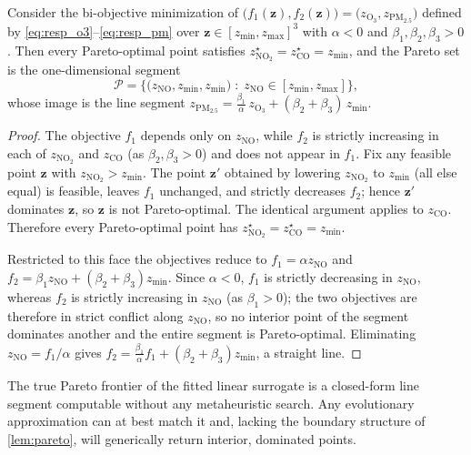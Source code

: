 \begin{lemma}
\label{lem:pareto}
Consider the bi-objective minimization of
$\big(f_1(\mathbf{z}),f_2(\mathbf{z})\big)=\big(z_{\mathrm{O_3}},z_{\mathrm{PM_{2.5}}}\big)$
defined by \eqref{eq:resp_o3}--\eqref{eq:resp_pm} over
$\mathbf{z}\in[z_{\min},z_{\max}]^3$ with $\alpha<0$ and $\beta_1,\beta_2,\beta_3>0$.
Then every Pareto-optimal point satisfies
$z_{\mathrm{NO_2}}^{\star}=z_{\mathrm{CO}}^{\star}=z_{\min}$, and the Pareto set is the
one-dimensional segment
\[
  \mathcal{P}=\Big\{\big(z_{\mathrm{NO}},z_{\min},z_{\min}\big)\;:\;
  z_{\mathrm{NO}}\in[z_{\min},z_{\max}]\Big\},
\]
whose image is the line segment
$z_{\mathrm{PM_{2.5}}} = \tfrac{\beta_1}{\alpha}\,z_{\mathrm{O_3}}
+(\beta_2+\beta_3)\,z_{\min}$.
\end{lemma}

\begin{proof}
The objective $f_1$ depends only on $z_{\mathrm{NO}}$, while $f_2$ is strictly
increasing in each of $z_{\mathrm{NO_2}}$ and $z_{\mathrm{CO}}$ (as $\beta_2,\beta_3>0$)
and does not appear in $f_1$. Fix any feasible point $\mathbf{z}$ with
$z_{\mathrm{NO_2}}>z_{\min}$. The point $\mathbf{z}'$ obtained by lowering
$z_{\mathrm{NO_2}}$ to $z_{\min}$ (all else equal) is feasible, leaves $f_1$ unchanged,
and strictly decreases $f_2$; hence $\mathbf{z}'$ dominates $\mathbf{z}$, so $\mathbf{z}$
is not Pareto-optimal. The identical argument applies to $z_{\mathrm{CO}}$. Therefore
every Pareto-optimal point has $z_{\mathrm{NO_2}}^{\star}=z_{\mathrm{CO}}^{\star}=z_{\min}$.

Restricted to this face the objectives reduce to
$f_1=\alpha z_{\mathrm{NO}}$ and
$f_2=\beta_1 z_{\mathrm{NO}} + (\beta_2+\beta_3)z_{\min}$. Since $\alpha<0$, $f_1$ is
strictly decreasing in $z_{\mathrm{NO}}$, whereas $f_2$ is strictly increasing in
$z_{\mathrm{NO}}$ (as $\beta_1>0$); the two objectives are therefore in strict conflict
along $z_{\mathrm{NO}}$, so no interior point of the segment dominates another and the
entire segment is Pareto-optimal. Eliminating $z_{\mathrm{NO}}=f_1/\alpha$ gives
$f_2=\tfrac{\beta_1}{\alpha}f_1+(\beta_2+\beta_3)z_{\min}$, a straight line.
\end{proof}

\begin{corollary}
\label{cor:pareto}
The true Pareto frontier of the fitted linear surrogate is a closed-form line segment
computable without any metaheuristic search. Any evolutionary approximation can at best
match it and, lacking the boundary structure of \cref{lem:pareto}, will generically
return interior, dominated points.
\end{corollary}

